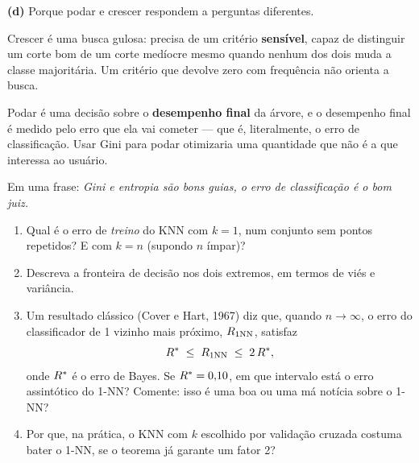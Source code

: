 \documentclass[11pt,a4paper]{article}
\begin{document}
\begin{solucao}
\smallskip
\textbf{(d)} Porque podar e crescer respondem a perguntas diferentes.

Crescer é uma busca gulosa: precisa de um critério \textbf{sensível}, capaz de
distinguir um corte bom de um corte medíocre mesmo quando nenhum dos dois muda a
classe majoritária. Um critério que devolve zero com frequência não orienta a
busca.

Podar é uma decisão sobre o \textbf{desempenho final} da árvore, e o desempenho
final é medido pelo erro que ela vai cometer --- que é, literalmente, o erro de
classificação. Usar Gini para podar otimizaria uma quantidade que não é a que
interessa ao usuário.

Em uma frase: \emph{Gini e entropia são bons guias, o erro de classificação é o
bom juiz.}
\end{solucao}

\begin{exercicio}
\begin{enumerate}[label=(\alph*),leftmargin=1.1cm]
  \item Qual é o erro de \emph{treino} do KNN com $k=1$, num conjunto sem pontos
        repetidos? E com $k=n$ (supondo $n$ ímpar)?
  \item Descreva a fronteira de decisão nos dois extremos, em termos de viés e
        variância.
  \item Um resultado clássico (Cover e Hart, 1967) diz que, quando
        $n\to\infty$, o erro do classificador de 1 vizinho mais próximo,
        $R_{1\text{NN}}$, satisfaz
        \[
          R^\ast \;\le\; R_{1\text{NN}} \;\le\; 2\,R^\ast ,
        \]
        onde $R^\ast$ é o erro de Bayes. Se $R^\ast=0{,}10$, em que
        intervalo está o erro assintótico do 1-NN? Comente: isso é uma boa ou uma
        má notícia sobre o 1-NN?
  \item Por que, na prática, o KNN com $k$ escolhido por validação cruzada
        costuma bater o 1-NN, se o teorema já garante um fator 2?
\end{enumerate}
\end{exercicio}
\end{document}

